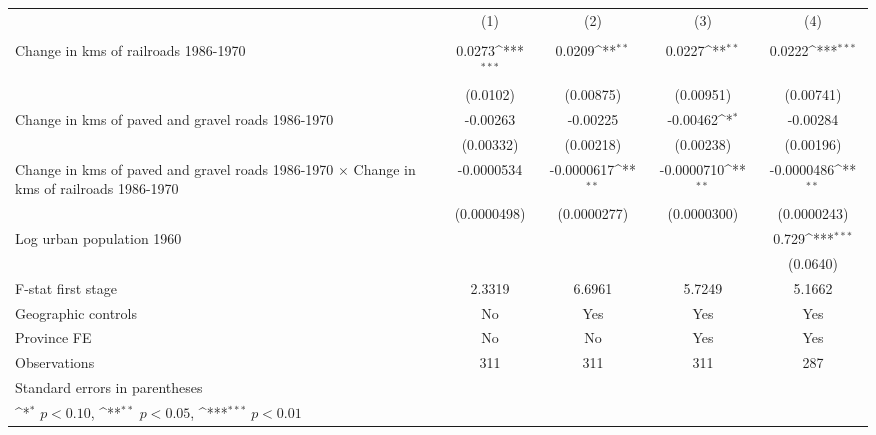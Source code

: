 {
\def\sym#1{\ifmmode^{#1}\else\(^{#1}\)\fi}
\begin{tabular}{l*{4}{c}}
\hline\hline
                &\multicolumn{1}{c}{(1)}&\multicolumn{1}{c}{(2)}&\multicolumn{1}{c}{(3)}&\multicolumn{1}{c}{(4)}\\
                &\multicolumn{1}{c}{}&\multicolumn{1}{c}{}&\multicolumn{1}{c}{}&\multicolumn{1}{c}{}\\
\hline
Change in kms of railroads 1986-1970&   0.0273\sym{***}&   0.0209\sym{**} &   0.0227\sym{**} &   0.0222\sym{***}\\
                & (0.0102)         &(0.00875)         &(0.00951)         &(0.00741)         \\
[1em]
Change in kms of paved and gravel roads 1986-1970& -0.00263         & -0.00225         & -0.00462\sym{*}  & -0.00284         \\
                &(0.00332)         &(0.00218)         &(0.00238)         &(0.00196)         \\
[1em]
Change in kms of paved and gravel roads 1986-1970 $\times$ Change in kms of railroads 1986-1970&-0.0000534         &-0.0000617\sym{**} &-0.0000710\sym{**} &-0.0000486\sym{**} \\
                &(0.0000498)         &(0.0000277)         &(0.0000300)         &(0.0000243)         \\
[1em]
Log urban population 1960&                  &                  &                  &    0.729\sym{***}\\
                &                  &                  &                  & (0.0640)         \\
\hline
F-stat first stage&   2.3319         &   6.6961         &   5.7249         &   5.1662         \\
Geographic controls&       No         &      Yes         &      Yes         &      Yes         \\
Province FE     &       No         &       No         &      Yes         &      Yes         \\
Observations    &      311         &      311         &      311         &      287         \\
\hline\hline
\multicolumn{5}{l}{\footnotesize Standard errors in parentheses}\\
\multicolumn{5}{l}{\footnotesize \sym{*} \(p<0.10\), \sym{**} \(p<0.05\), \sym{***} \(p<0.01\)}\\
\end{tabular}
}
